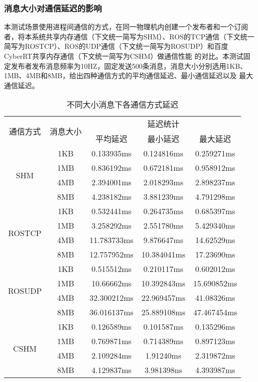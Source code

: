 \subsubsection{消息大小对通信延迟的影响}
本测试场景使用进程间通信的方式，在同一物理机内创建一个发布者和一个订阅者，将本系统共享内存通信（下文统一简写为SHM）、ROS的TCP通信（下文统一简写为ROSTCP）、ROS的UDP通信（下文统一简写为ROSUDP）和百度CyberRT共享内存通信（下文统一简写为CSHM）做通信性能
的对比。本测试固定发布者发布消息频率为10HZ，固定发送500条消息，消息大小分别选用1KB、1MB、4MB和8MB，给出四种通信方式的平均通信延迟、最小通信延迟以及
最大通信延迟。
\begin{table}[htb]
  \centering\small
  \caption{不同大小消息下各通信方式延迟}
  \renewcommand\arraystretch{1.2}
  \label{one_to_one}
  \begin{tabular}{ccccc}
    \toprule
    \multirow{2}{*}{通信方式} & \multirow{2}{*}{消息大小} & \multicolumn{3}{c}{延迟统计}\\
     & & 平均延迟 & 最小延迟 & 最大延迟\\
    \midrule
    \multirow{4}{*}{SHM} & 1KB& 0.133935ms& 0.124816ms& 0.259271ms\\ & 1MB & 0.836192ms & 0.672181ms & 0.958912ms \\ & 4MB & 2.394001ms & 2.018293ms & 2.898237ms \\ & 8MB & 4.238182ms & 3.881239ms & 4.791298ms\\
    \hline
    \multirow{4}{*}{ROSTCP} & 1KB& 0.532441ms& 0.264735ms& 0.685397ms\\ & 1MB & 3.258292ms & 2.551780ms & 5.429340ms \\ & 4MB & 11.783733ms & 9.876647ms & 14.62529ms \\ & 8MB & 12.757952ms & 10.384041ms & 17.23690ms\\
    \hline
    \multirow{4}{*}{ROSUDP} & 1KB& 0.515512ms& 0.210117ms& 0.602012ms\\ & 1MB & 10.66662ms & 10.392843ms & 15.690852ms \\ & 4MB & 32.300212ms & 22.969457ms & 41.08326ms \\ & 8MB & 36.016137ms & 25.889108ms & 47.467454ms\\
    \hline
    \multirow{4}{*}{CSHM} & 1KB& 0.126589ms& 0.101587ms& 0.135296ms\\ & 1MB & 0.769871ms & 0.714389ms & 0.897123ms \\ & 4MB & 2.109284ms & 1.91240ms & 2.319872ms \\ & 8MB & 4.129837ms & 3.981398ns & 4.393987ms\\
    \bottomrule
  \end{tabular}
\end{table}


